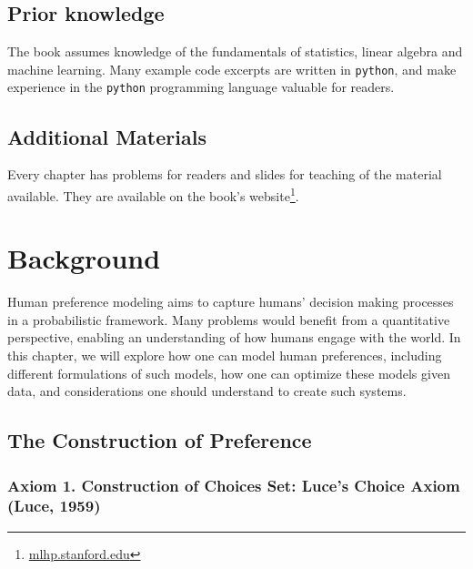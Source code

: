 \documentclass[
  letterpaper,
  numbers=noenddot,
  DIV=11]{scrreprt}
\let\oldchapter\chapter
\def\chapter{%
  \setcounter{sidenote}{1}%
  \oldchapter
}
\theoremstyle{plain}
\theoremstyle{definition}
\theoremstyle{remark}
\DeclareRobustCommand{\href}[2]{#2\footnote{\url{#1}}}
\begin{document}
\section*{Prior knowledge}\label{prior-knowledge}


The book assumes knowledge of the fundamentals of statistics, linear
algebra and machine learning. Many example code excerpts are written in
\texttt{python}, and make experience in the \texttt{python} programming
language valuable for readers.

\section*{Additional Materials}\label{additional-materials}


Every chapter has problems for readers and slides for teaching of the
material available. They are available on the
\href{mlhp.stanford.edu}{book's website}.


\chapter{Background}\label{background-1}

Human preference modeling aims to capture humans' decision making
processes in a probabilistic framework. Many problems would benefit from
a quantitative perspective, enabling an understanding of how humans
engage with the world. In this chapter, we will explore how one can
model human preferences, including different formulations of such
models, how one can optimize these models given data, and considerations
one should understand to create such systems.

\section{The Construction of Preference}\label{sec-foundations}

\subsection{Axiom 1. Construction of Choices Set: Luce's Choice Axiom
(Luce, 1959)}\label{axiom-1-preference-models-model-choice}
\end{document}
